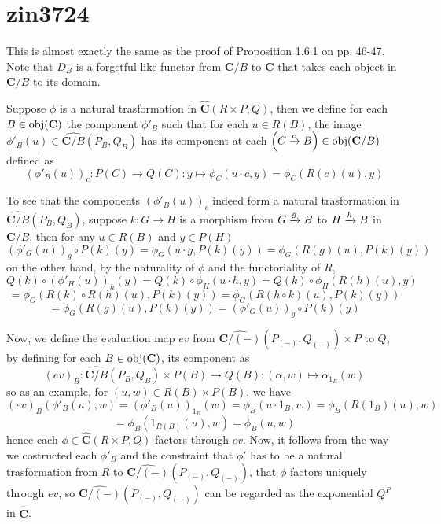\section{zin3724}
This is almost exactly the same as the proof of Proposition 1.6.1 on pp. 46-47. Note that $D_B$ is a forgetful-like functor from $\mathbf C/B$ to $\mathbf C$ that takes each object in $\mathbf C/B$ to its domain.

Suppose $\phi$ is a natural trasformation in $\widehat{\mathbf{C}}(R\times P,Q)$, then we define for each $B\in\operatorname{\operatorname{obj}}(\mathbf C)$ the component $\phi'_B$ such that for each $u\in R(B)$, the image $\phi'_B(u)\in\widehat{\mathbf{C}/B}(P_B,Q_B)$ has its component at each $\left(C\xrightarrow{c}B\right)\in\operatorname{\operatorname{obj}}(\mathbf C/B)$ defined as
\[(\phi'_B(u))_c:P(C)\to Q(C):y\mapsto\phi_C(u\cdot c,y)=\phi_C(R(c)(u),y)\]

To see that the components $(\phi'_B(u))_c$ indeed form a natural trasformation in $\widehat{\mathbf{C}/B}(P_B,Q_B)$, suppose $k:G\to H$ is a morphism from $G\xrightarrow{g}B$ to $H\xrightarrow{h}B$ in $\mathbf{C}/B$, then for any $u\in R(B)$ and $y\in P(H)$
\[(\phi'_G(u))_g\circ P(k)(y)=\phi_G(u\cdot g,P(k)(y))=\phi_G(R(g)(u),P(k)(y))\]
on the other hand, by the naturality of $\phi$ and the functoriality of $R$,
\[Q(k)\circ(\phi'_H(u))_h(y)=Q(k)\circ\phi_H(u\cdot h,y)=Q(k)\circ\phi_H(R(h)(u),y)\]
\[=\phi_G(R(k)\circ R(h)(u),P(k)(y))=\phi_G(R(h\circ k)(u),P(k)(y))\]
\[=\phi_G(R(g)(u),P(k)(y))=(\phi'_G(u))_g\circ P(k)(y)\]

Now, we define the evaluation map $ev$ from $\widehat{\mathbf{C}/(-)}(P_{(-)},Q_{(-)})\times P$ to $Q$, by defining for each $B\in\operatorname{\operatorname{obj}}(\mathbf{C})$, its component as
\[(ev)_B:\widehat{\mathbf{C}/B}(P_B,Q_B)\times P(B)\to Q(B):(\alpha,w)\mapsto\alpha_{1_B}(w)\]
so as an example, for $(u,w)\in R(B)\times P(B)$, we have
\[(ev)_B(\phi'_B(u),w)=(\phi'_B(u))_{1_B}(w)=\phi_B(u\cdot1_B,w)=\phi_B(R(1_B)(u),w)\]
\[=\phi_B(1_{R(B)}(u),w)=\phi_B(u,w)\]
hence each $\phi\in\widehat{\mathbf{C}}(R\times P,Q)$ factors through $ev$. Now, it follows from the way we costructed each $\phi'_B$ and the constraint that $\phi'$ has to be a natural trasformation from $R$ to $\widehat{\mathbf{C}/(-)}(P_{(-)},Q_{(-)})$, that $\phi$ factors uniquely through $ev$, so $\widehat{\mathbf{C}/(-)}(P_{(-)},Q_{(-)})$ can be regarded as the exponential $Q^P$ in $\widehat{\mathbf{C}}$.